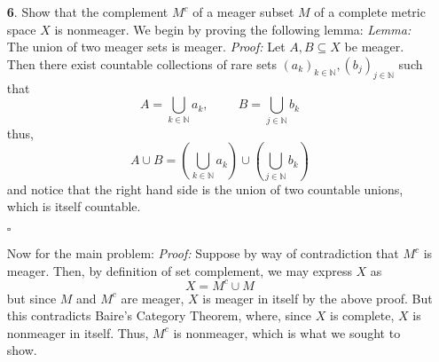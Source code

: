 \documentclass{article}
\begin{document}
\begin{itemize}
    \item[\textbf{6}.] Show that the complement $M^c$ of a meager subset $M$ of a complete metric space $X$ is nonmeager. 
    \newline\newline
    We begin by proving the following lemma:
    \newline
    \textit{Lemma:}
    The union of two meager sets is meager. 
    \newline\newline
    \textit{Proof:} Let $A, B \subseteq X$ be meager. Then there exist countable collections of rare sets $(a_k)_{k \in \mathbb{N}}, (b_j)_{j \in \mathbb{N}}$ such that
    \[A = \bigcup_{k \in \mathbb{N}} a_k, \hspace{1cm} B = \bigcup_{j \in \mathbb{N}} b_k\]
    thus,
    \[A \cup B = \left(\bigcup_{k \in \mathbb{N}} a_k\right) \cup \left(\bigcup_{j \in \mathbb{N}} b_k\right)\]
    and notice that the right hand side is the union of two countable unions, which is itself countable. 
    \begin{flushright}
        $\square$
    \end{flushright}
    Now for the main problem:
    \newline\newline
    \textit{Proof:}
    Suppose by way of contradiction that $M^c$ is meager. Then, by definition of set complement, we may express $X$ as
    \[X = M^c \cup M\]
    but since $M$ and $M^c$ are meager, $X$ is meager in itself by the above proof. But this contradicts Baire's Category Theorem, where, since $X$ is complete, $X$ is nonmeager in itself. Thus, $M^c$ is nonmeager, which is what we sought to show.



\end{itemize}
\end{document}
